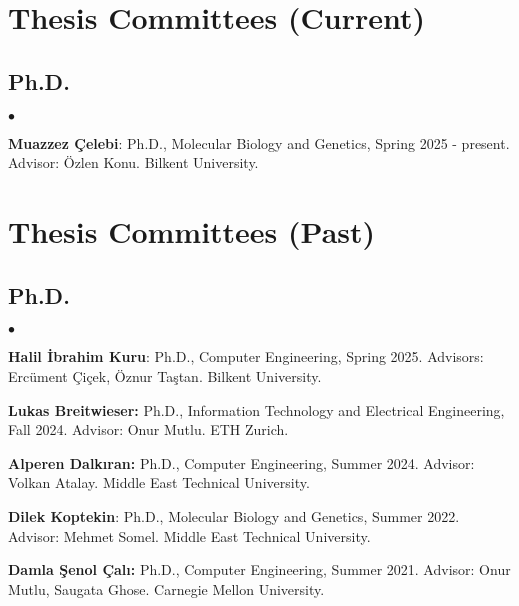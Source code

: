 \documentclass[margin,line]{res}
\newenvironment{list2}{
  \begin{list}{$\bullet$}{%
      \setlength{\itemsep}{0.1cm}
      \setlength{\parsep}{0in} \setlength{\parskip}{0in}
      \setlength{\topsep}{0in} \setlength{\partopsep}{0in} 
      \setlength{\leftmargin}{0.2in}}}{\end{list}}
\begin{document}
\begin{resume}
\section{\sc Thesis Committees (Current)}

\vspace*{-.4cm}
\subsection{\small \sc Ph.D.}
\begin{list2}
\item 
{\bf Muazzez Çelebi}: Ph.D., Molecular Biology and Genetics, Spring 2025 - present.
Advisor: Özlen Konu. Bilkent University.
\end{list2}


\section{\sc Thesis Committees (Past)}
\vspace*{-.4cm}
\subsection{\small \sc Ph.D.}
\begin{list2}
\item
{\bf Halil İbrahim Kuru}: Ph.D., Computer Engineering, Spring 2025.
  Advisors: Ercüment Çiçek, Öznur Taştan.
  Bilkent University.
\item 
\textbf{Lukas Breitwieser:} Ph.D.,  Information Technology and Electrical Engineering, Fall 2024.
Advisor: Onur Mutlu. ETH Zurich.
\item
  {\bf Alperen Dalkıran:} Ph.D., Computer Engineering, Summer 2024.
  Advisor: Volkan Atalay.
  Middle East Technical University.
\item
{\bf Dilek Koptekin}: Ph.D., Molecular Biology and Genetics, Summer 2022.
Advisor: Mehmet Somel. Middle East Technical University.

\item 
{\bf Damla Şenol Çalı:} Ph.D., Computer Engineering, Summer 2021. Advisor: Onur Mutlu, Saugata Ghose. Carnegie Mellon University.


\end{list2}
\end{resume}
\end{document}
